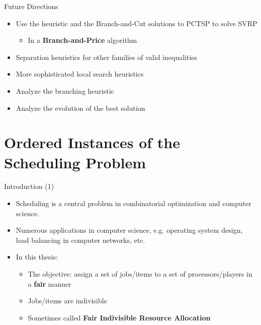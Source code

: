 \begin{frame}[t]{Future Directions}
    \begin{itemize}
        \item<1-> Use the heuristic and the Branch-and-Cut solutions to PCTSP to solve SVRP
            \begin{itemize}
                \item<2-> In a \textbf{Branch-and-Price} algorithm
            \end{itemize}
        \item<3-> Separation heuristics for other families of valid inequalities
        \item<4-> More sophisticated local search heuristics
        \item<5-> Analyze the branching heuristic
        \item<6-> Analyze the evolution of the best solution
    \end{itemize}
\end{frame}

\section{Ordered Instances of the Scheduling Problem}
\frame{\textbf{\insertsection}}


\begin{frame}[t]{Introduction (1)}
    \begin{itemize}
        \item<1-> Scheduling is a central problem in combinatorial optimization and computer science.
        \item<2-> Numerous applications in computer science, e.g. operating system design, load balancing in computer networks, etc.
        \item<3-> In this thesis:
            \begin{itemize}
                \item<4-> The objective: assign a set of jobs/items to a set of processors/players in a \textbf{fair} manner
                \item<5-> Jobs/items are indivisible
                \item<6-> Sometimes called \textbf{Fair Indivisible Resource Allocation}            
            \end{itemize}
    \end{itemize}
\end{frame}

